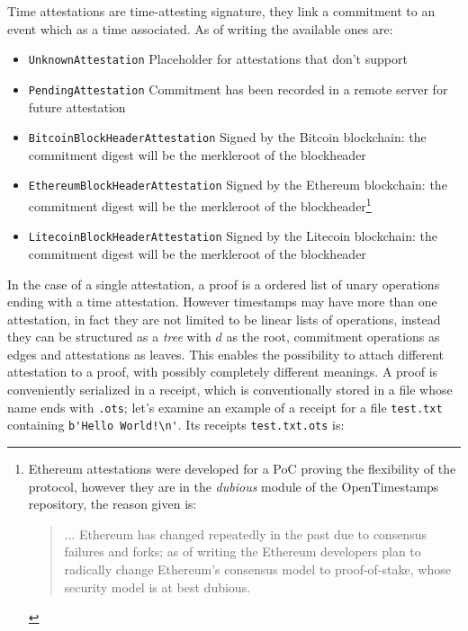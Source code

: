 Time attestations are time-attesting signature, they link a commitment to an event which as a time associated. As of writing the available ones are:
\begin{itemize}
	\item \verb|UnknownAttestation| Placeholder for attestations that don't support
	\item \verb|PendingAttestation| Commitment has been recorded in a remote server for future attestation
	\item \verb|BitcoinBlockHeaderAttestation| Signed by the Bitcoin blockchain: the commitment digest will be the merkleroot of the blockheader
	\item \verb|EthereumBlockHeaderAttestation| Signed by the Ethereum blockchain: the commitment digest will be the merkleroot of the blockheader\footnote{Ethereum attestations were developed for a PoC proving the flexibility of the protocol, however they are in the \textit{dubious} module of the OpenTimestamps repository, the reason given is:
		\begin{quotation}
			... Ethereum has changed repeatedly in the past due to consensus failures and forks; as of writing the Ethereum developers plan to radically change Ethereum's consensus model to proof-of-stake, whose security model is at best dubious.
	\end{quotation}}
	\item 
	\verb|LitecoinBlockHeaderAttestation| Signed by the Litecoin blockchain: the commitment digest will be the merkleroot of the blockheader
\end{itemize}
In the case of a single attestation, a proof is a ordered list of unary operations ending with a time attestation.  
However timestamps may have more than one attestation, in fact they are not limited to be linear lists of operations, instead they can be structured as a \textit{tree} with $d$ as the root, commitment operations as edges and attestations as leaves.
This enables the possibility to attach different attestation to a proof, with possibly completely different meanings.
A proof is conveniently serialized in a receipt, which is conventionally stored in a file whose name ends with \verb|.ots|;
let's examine an example of a receipt for a file \verb|test.txt| containing \verb|b'Hello World!\n'|. 
Its receipts \verb|test.txt.ots| is:
